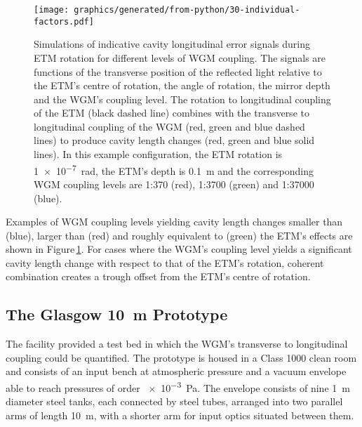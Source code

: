 \begin{figure}
  \centering
  \texttt{[image: graphics/generated/from-python/30-individual-factors.pdf]}
  \caption{\label{fig:coupling-contributions}Simulations of indicative cavity longitudinal error signals during \gls{ETM} rotation for different levels of \gls{WGM} coupling. The signals are functions of the transverse position of the reflected light relative to the \gls{ETM}'s centre of rotation, the angle of rotation, the mirror depth and the \gls{WGM}'s coupling level. The rotation to longitudinal coupling of the \gls{ETM} (black dashed line) combines with the transverse to longitudinal coupling of the \gls{WGM} (red, green and blue dashed lines) to produce cavity length changes (red, green and blue solid lines). In this example configuration, the \gls{ETM} rotation is \SI{1e-7}{\radian}, the \gls{ETM}'s depth is \SI{0.1}{\meter} and the corresponding \gls{WGM} coupling levels are 1:370 (red), 1:3700 (green) and 1:37000 (blue).}
\end{figure}

Examples of \gls{WGM} coupling levels yielding cavity length changes smaller than (blue), larger than (red) and roughly equivalent to (green) the \gls{ETM}'s effects are shown in Figure\,\ref{fig:coupling-contributions}. For cases where the \gls{WGM}'s coupling level yields a significant cavity length change with respect to that of the \gls{ETM}'s rotation, coherent combination creates a trough offset from the \gls{ETM}'s centre of rotation.

%
%

\subsection{The Glasgow 10~m Prototype}
\label{sec:glasgow10m}

The \GLASGOWTENM{} facility provided a test bed in which the \gls{WGM}'s transverse to longitudinal coupling could be quantified. The prototype is housed in a Class 1000 clean room and consists of an input bench at atmospheric pressure and a vacuum envelope able to reach pressures of order \SI{e-3}{\pascal}. The envelope consists of nine \SI{1}{\meter} diameter steel tanks, each connected by steel tubes, arranged into two parallel arms of length \SI{10}{\meter}, with a shorter arm for input optics situated between them.


